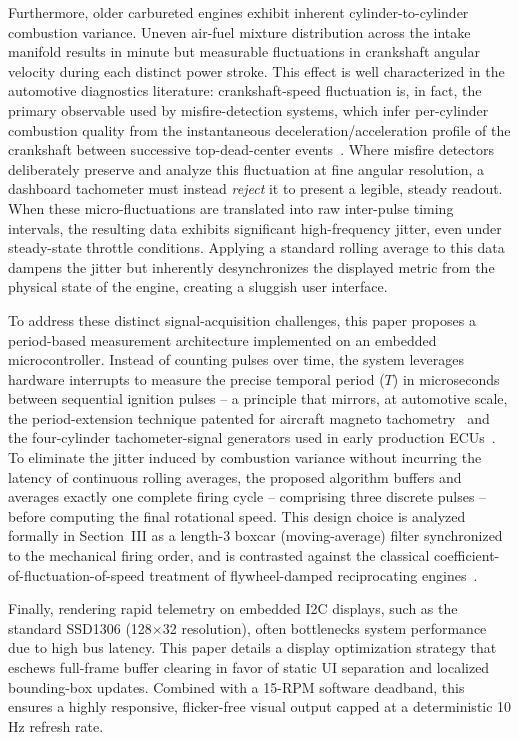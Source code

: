 \documentclass[journal, twocolumn]{IEEEtran}
\begin{document}
Furthermore, older carbureted engines exhibit inherent cylinder-to-cylinder combustion variance. Uneven air-fuel mixture distribution across the intake manifold results in minute but measurable fluctuations in crankshaft angular velocity during each distinct power stroke. This effect is well characterized in the automotive diagnostics literature: crankshaft-speed fluctuation is, in fact, the primary observable used by misfire-detection systems, which infer per-cylinder combustion quality from the instantaneous deceleration/acceleration profile of the crankshaft between successive top-dead-center events~\cite{rizzoni1989,klenk1993,misfire2011}. Where misfire detectors deliberately preserve and analyze this fluctuation at fine angular resolution, a dashboard tachometer must instead \emph{reject} it to present a legible, steady readout. When these micro-fluctuations are translated into raw inter-pulse timing intervals, the resulting data exhibits significant high-frequency jitter, even under steady-state throttle conditions. Applying a standard rolling average to this data dampens the jitter but inherently desynchronizes the displayed metric from the physical state of the engine, creating a sluggish user interface.

To address these distinct signal-acquisition challenges, this paper proposes a period-based measurement architecture implemented on an embedded microcontroller. Instead of counting pulses over time, the system leverages hardware interrupts to measure the precise temporal period ($T$) in microseconds between sequential ignition pulses -- a principle that mirrors, at automotive scale, the period-extension technique patented for aircraft magneto tachometry~\cite{krattenmacher1989} and the four-cylinder tachometer-signal generators used in early production ECUs~\cite{nissan1992}. To eliminate the jitter induced by combustion variance without incurring the latency of continuous rolling averages, the proposed algorithm buffers and averages exactly one complete firing cycle -- comprising three discrete pulses -- before computing the final rotational speed. This design choice is analyzed formally in Section~III as a length-3 boxcar (moving-average) filter synchronized to the mechanical firing order, and is contrasted against the classical coefficient-of-fluctuation-of-speed treatment of flywheel-damped reciprocating engines~\cite{khurmi_tom,lomakin2018}.

Finally, rendering rapid telemetry on embedded I2C displays, such as the standard SSD1306 (128$\times$32 resolution), often bottlenecks system performance due to high bus latency. This paper details a display optimization strategy that eschews full-frame buffer clearing in favor of static UI separation and localized bounding-box updates. Combined with a 15-RPM software deadband, this ensures a highly responsive, flicker-free visual output capped at a deterministic 10 Hz refresh rate.
\end{document}
